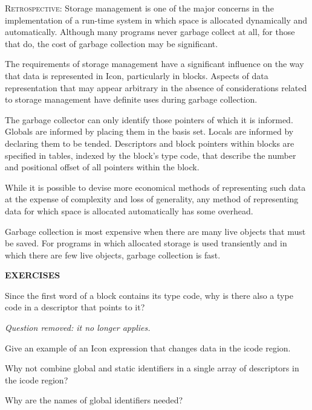 \textsc{Retrospective}: Storage management is one of the major
concerns in the implementation of a run-time system in which space is
allocated dynamically and automatically. Although many programs never
garbage collect at all, for those that do, the cost of garbage
collection may be significant.

The requirements of storage management have a significant influence on
the way that data is represented in Icon, particularly in
blocks. Aspects of data representation that may appear arbitrary in
the absence of considerations related to storage management have
definite uses during garbage collection.

The garbage collector can only identify those pointers of which it is
informed. Globals are informed by placing them in the basis
set. Locals are informed by declaring them to be tended. Descriptors
and block pointers within blocks are specified in tables, indexed by
the block's type code, that describe the number and positional offset
of all pointers within the block.

While it is possible to devise more economical methods of representing
such data at the expense of complexity and loss of generality, any
method of representing data for which space is allocated automatically
has some overhead.

Garbage collection is most expensive when there are many live objects
that must be saved. For programs in which allocated storage is used
transiently and in which there are few live objects, garbage
collection is fast.

\bigskip

\noindent\textbf{EXERCISES}

 Since the first word of a block contains its type
code, why is there also a type code in a descriptor that points to it?

{\em Question removed: it no longer applies.}

 Give an example of an Icon expression that
changes data in the icode region.

 Why not combine global and static identifiers in
a single array of descriptors in the icode region?

 Why are the names of global identifiers needed?

